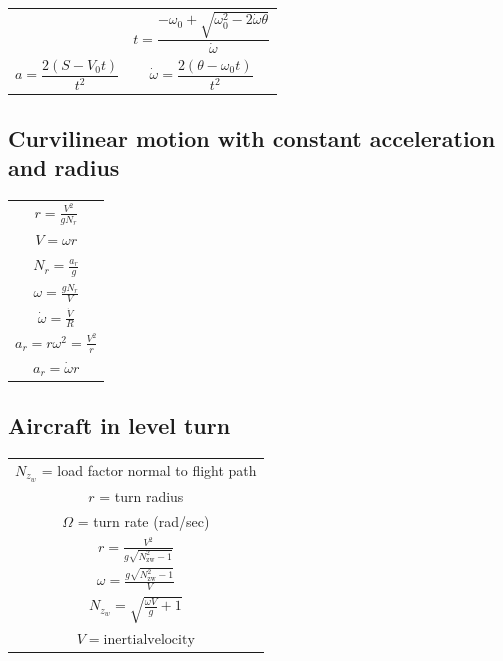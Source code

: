\documentclass[
]{book}
\begin{document}
\begin{longtable}[]{@{}ll@{}}
\begin{minipage}[t]{0.37\columnwidth}
\end{minipage} & \begin{minipage}[t]{0.57\columnwidth}\raggedright
\[t = \frac{- \omega_{0} + \sqrt{\omega_{0}^{2} - 2\dot{\omega}\theta}}{\dot{\omega}}\]\strut
\end{minipage}\tabularnewline
\begin{minipage}[t]{0.37\columnwidth}\raggedright
\[a = \frac{2\left( S - V_{0}t \right)}{t^{2}}\]\strut
\end{minipage} & \begin{minipage}[t]{0.57\columnwidth}\raggedright
\[\dot{\omega} = \frac{2(\theta - \omega_{0}t)}{t^{2}}\]\strut
\end{minipage}\tabularnewline
\bottomrule
\end{longtable}

\hypertarget{curvilinear-motion-with-constant-acceleration-and-radius}{%
\subsection{Curvilinear motion with constant acceleration and radius}\label{curvilinear-motion-with-constant-acceleration-and-radius}}

\begin{longtable}[]{@{}c@{}}
\toprule
\endhead
\(r = \frac{V^2}{g N_r}\)\tabularnewline
\(V = \omega r\)\tabularnewline
\(N_r = \frac{a_r}{g}\)\tabularnewline
\(\omega = \frac{g N_r}{V}\)\tabularnewline
\(\dot{\omega} = \frac{\dot{V}}{R}\)\tabularnewline
\(a_r = r \omega^2 = \frac{V^2}{r}\)\tabularnewline
\(a_{r} = \dot{\omega}r\)\tabularnewline
\bottomrule
\end{longtable}

\hypertarget{aircraft-in-level-turn}{%
\subsection{Aircraft in level turn}\label{aircraft-in-level-turn}}

\begin{longtable}[]{@{}c@{}}
\toprule
\endhead
\(N_{z_w}\) = load factor normal to flight path\tabularnewline
\(r\) = turn radius\tabularnewline
\(\Omega\) = turn rate (rad/sec)\tabularnewline
\(r = \frac{V^{2}}{g\sqrt{N_{\mathrm{zw}}^{2} - 1}}\)\tabularnewline
\(\omega = \frac{g\sqrt{N_{\mathrm{zw}}^{2} - 1}}{V}\)\tabularnewline
\(N_{z_w} = \sqrt{\frac{\omega V}{g} + 1}\)\tabularnewline
\(V = \mathrm{inertial velocity} \)\tabularnewline
\bottomrule
\end{longtable}
\end{document}
